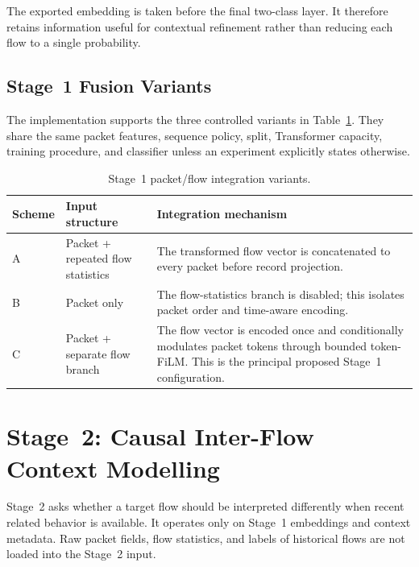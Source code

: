 \documentclass[11pt,fleqn]{report}
\begin{document}
The exported embedding is taken before the final two-class layer. It therefore
retains information useful for contextual refinement rather than reducing each
flow to a single probability.

\subsection{Stage~1 Fusion Variants}
\label{subsubsec:stage1_variants}

The implementation supports the three controlled variants in
Table~\ref{tab:stage1_fusion_variants}. They share the same packet features,
sequence policy, split, Transformer capacity, training procedure, and classifier
unless an experiment explicitly states otherwise.

\begin{table}[H]
    \centering
    \caption{Stage~1 packet/flow integration variants.}
    \label{tab:stage1_fusion_variants}
    \small
    \begin{tabular}{@{}p{1.1cm}p{3.1cm}p{8.9cm}@{}}
        \toprule
        Scheme & Input structure & Integration mechanism \\
        \midrule
        A & Packet + repeated flow statistics & The transformed flow vector is
        concatenated to every packet before record projection. \\
        B & Packet only & The flow-statistics branch is disabled; this isolates
        packet order and time-aware encoding. \\
        C & Packet + separate flow branch & The flow vector is encoded once and
        conditionally modulates packet tokens through bounded token-FiLM. This
        is the principal proposed Stage~1 configuration. \\
        \bottomrule
    \end{tabular}
\end{table}

\section{Stage~2: Causal Inter-Flow Context Modelling}
\label{subsec:method_stage2}

Stage~2 asks whether a target flow should be interpreted differently when
recent related behavior is available. It operates only on Stage~1 embeddings
and context metadata. Raw packet fields, flow statistics, and labels of
historical flows are not loaded into the Stage~2 input.
\end{document}
